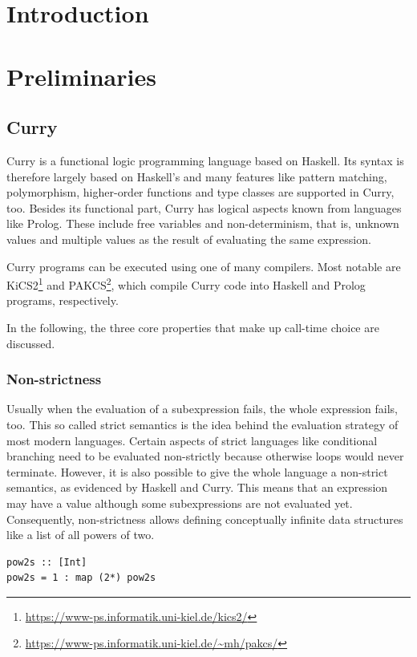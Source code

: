 \documentclass[a4paper, 11pt, fleqn, twoside]{scrreprt}
\begin{document}

\chapter{Introduction}

\chapter{Preliminaries}

\section{Curry}
Curry \citep{hanus2016curry} is a functional logic programming language based on Haskell.
Its syntax is therefore largely based on Haskell's and many features like pattern matching, polymorphism, higher-order functions and type classes are supported in Curry, too.
Besides its functional part, Curry has logical aspects known from languages like Prolog.
These include free variables and non-determinism, that is, unknown values and multiple values as the result of evaluating the same expression.

Curry programs can be executed using one of many compilers.
Most notable are KiCS2\footnote{\url{https://www-ps.informatik.uni-kiel.de/kics2/}} and PAKCS\footnote{\url{https://www-ps.informatik.uni-kiel.de/~mh/pakcs/}}, which compile Curry code into Haskell and Prolog programs, respectively.

In the following, the three core properties that make up call-time choice are discussed.

\subsection{Non-strictness}
Usually when the evaluation of a subexpression fails, the whole expression fails, too.
This so called strict semantics is the idea behind the evaluation strategy of most modern languages.
Certain aspects of strict languages like conditional branching need to be evaluated non-strictly because otherwise loops would never terminate.
However, it is also possible to give the whole language a non-strict semantics, as evidenced by Haskell and Curry.
This means that an expression may have a value although some subexpressions are not evaluated yet.
Consequently, non-strictness allows defining conceptually infinite data structures like a list of all powers of two.

\begin{verbatim}
pow2s :: [Int]
pow2s = 1 : map (2*) pow2s
\end{verbatim}
\end{document}
